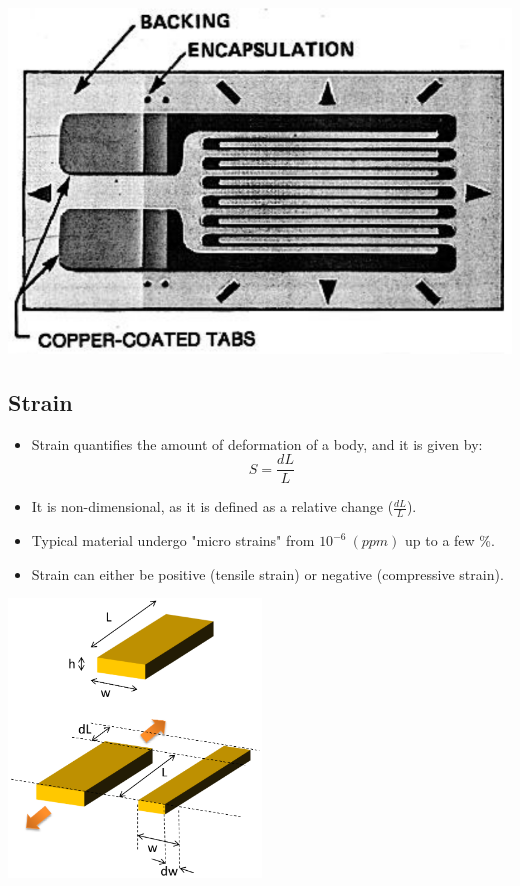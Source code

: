 \documentclass[11pt]{article}
\begin{document}
\begin{center}
\includegraphics[width=.9\linewidth]{./images/electrical-resistance-strain-gauge-diagram.png}
\end{center}

 \newpage
\subsection{Strain}
\label{sec:org9d2c010}
\begin{itemize}
\item Strain quantifies the amount of deformation of a body, and it is given by:
\[S = \frac{dL}{L}\]
\item It is non-dimensional, as it is defined as a relative change (\(\frac{dL}{L}\)).
\item Typical material undergo "micro strains" from \(10^{-6} \ (\unit{ppm})\) up to a few \%.
\item Strain can either be positive (tensile strain) or negative (compressive strain).
\end{itemize}

\begin{center}
\includegraphics[height=20em]{./images/strain-illustration.png}
\end{center}
\end{document}
